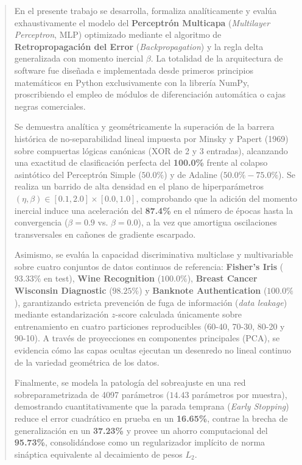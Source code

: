 \documentclass{article}
\begin{document}
\begin{abstract}
En el presente trabajo se desarrolla, formaliza analíticamente y evalúa exhaustivamente el modelo del \textbf{Perceptrón Multicapa} (\textit{Multilayer Perceptron}, MLP) optimizado mediante el algoritmo de \textbf{Retropropagación del Error} (\textit{Backpropagation}) y la regla delta generalizada con momento inercial $\beta$. La totalidad de la arquitectura de software fue diseñada e implementada desde primeros principios matemáticos en Python exclusivamente con la librería NumPy, proscribiendo el empleo de módulos de diferenciación automática o cajas negras comerciales. 

Se demuestra analítica y geométricamente la superación de la barrera histórica de no-separabilidad lineal impuesta por Minsky y Papert (1969) sobre compuertas lógicas canónicas ($\text{XOR}$ de 2 y 3 entradas), alcanzando una exactitud de clasificación perfecta del \textbf{100.0\%} frente al colapso asintótico del Perceptrón Simple ($50.0\%$) y de Adaline ($50.0\%-75.0\%$). Se realiza un barrido de alta densidad en el plano de hiperparámetros $(\eta, \beta) \in [0.1, 2.0] \times [0.0, 1.0]$, comprobando que la adición del momento inercial induce una aceleración del \textbf{87.4\%} en el número de épocas hasta la convergencia ($\beta=0.9$ vs. $\beta=0.0$), a la vez que amortigua oscilaciones transversales en cañones de gradiente escarpado. 

Asimismo, se evalúa la capacidad discriminativa multiclase y multivariable sobre cuatro conjuntos de datos continuos de referencia: \textbf{Fisher's Iris} ($93.33\%$ en test), \textbf{Wine Recognition} ($100.0\%$), \textbf{Breast Cancer Wisconsin Diagnostic} ($98.25\%$) y \textbf{Banknote Authentication} ($100.0\%$), garantizando estricta prevención de fuga de información (\textit{data leakage}) mediante estandarización $z$-score calculada únicamente sobre entrenamiento en cuatro particiones reproducibles (60-40, 70-30, 80-20 y 90-10). A través de proyecciones en componentes principales (PCA), se evidencia cómo las capas ocultas ejecutan un desenredo no lineal continuo de la variedad geométrica de los datos. 

Finalmente, se modela la patología del sobreajuste en una red sobreparametrizada de 4097 parámetros ($14.43$ parámetros por muestra), demostrando cuantitativamente que la parada temprana (\textit{Early Stopping}) reduce el error cuadrático en prueba en un \textbf{16.65\%}, contrae la brecha de generalización en un \textbf{37.23\%} y provee un ahorro computacional del \textbf{95.73\%}, consolidándose como un regularizador implícito de norma sináptica equivalente al decaimiento de pesos $L_2$.
\end{abstract}
\end{document}
